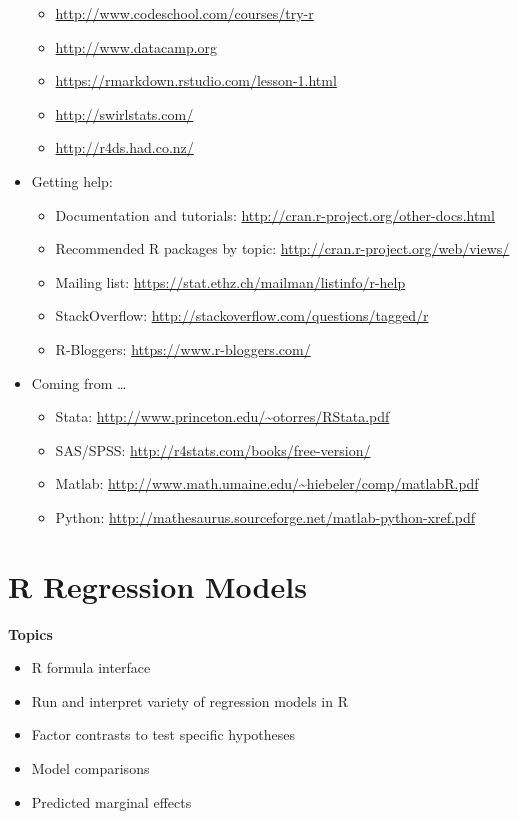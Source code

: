 \documentclass[]{book}
\providecommand{\tightlist}{%
  \setlength{\itemsep}{0pt}\setlength{\parskip}{0pt}}
\begin{document}
\begin{itemize}
  \begin{itemize}
  \tightlist
  \item
    \url{http://www.codeschool.com/courses/try-r}
  \item
    \url{http://www.datacamp.org}
  \item
    \url{https://rmarkdown.rstudio.com/lesson-1.html}
  \item
    \url{http://swirlstats.com/}
  \item
    \url{http://r4ds.had.co.nz/}
  \end{itemize}
\item
  Getting help:

  \begin{itemize}
  \tightlist
  \item
    Documentation and tutorials: \url{http://cran.r-project.org/other-docs.html}
  \item
    Recommended R packages by topic: \url{http://cran.r-project.org/web/views/}
  \item
    Mailing list: \url{https://stat.ethz.ch/mailman/listinfo/r-help}
  \item
    StackOverflow: \url{http://stackoverflow.com/questions/tagged/r}
  \item
    R-Bloggers: \url{https://www.r-bloggers.com/}
  \end{itemize}
\item
  Coming from \ldots{}

  \begin{itemize}
  \tightlist
  \item
    Stata: \url{http://www.princeton.edu/~otorres/RStata.pdf}
  \item
    SAS/SPSS: \url{http://r4stats.com/books/free-version/}
  \item
    Matlab: \url{http://www.math.umaine.edu/~hiebeler/comp/matlabR.pdf}
  \item
    Python: \url{http://mathesaurus.sourceforge.net/matlab-python-xref.pdf}
  \end{itemize}
\end{itemize}

\hypertarget{r-regression-models}{%
\chapter{R Regression Models}\label{r-regression-models}}

\textbf{Topics}

\begin{itemize}
\tightlist
\item
  R formula interface
\item
  Run and interpret variety of regression models in R
\item
  Factor contrasts to test specific hypotheses
\item
  Model comparisons
\item
  Predicted marginal effects
\end{itemize}
\end{document}
